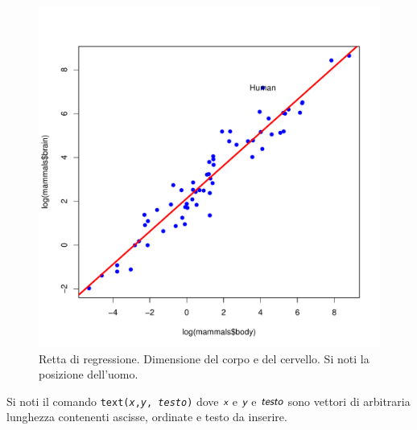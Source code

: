 \documentclass[onecolumn,12pt]{book}\usepackage[]{graphicx}\usepackage[]{color}
\makeatletter
\def\maxwidth{ %
  \ifdim\Gin@nat@width>\linewidth
    \linewidth
  \else
    \Gin@nat@width
  \fi
}
\newenvironment{knitrout}{}{} %
\newcommand{\varia}[1]{\textsl{\textsf{#1}}}
\makeatother
\begin{document}
\begin{figure}[htbp]
\begin{center}
\begin{knitrout}
\color{fgcolor}
\includegraphics[width=\maxwidth]{figure/unnamed-chunk-130-1} 

\end{knitrout}
\caption{ Retta di regressione. Dimensione del corpo e del cervello. Si noti la posizione dell'uomo.}
\label{duerette}
\end{center}
\end{figure}
Si noti il comando \texttt{text(\varia{x},\varia{y}, \varia{testo})}
dove    $\varia{x}$ e $\varia{y}$  e $\varia{testo}$ sono vettori di arbitraria lunghezza contenenti ascisse, ordinate e testo da inserire.
\end{document}
